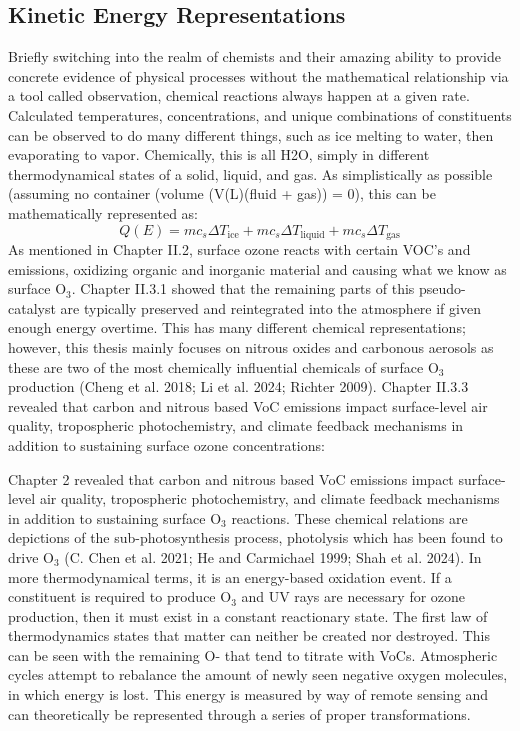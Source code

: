 \subsection{Kinetic Energy Representations} \label{methods:ke} Briefly switching into the realm of chemists and their amazing ability to provide concrete evidence of physical processes without the mathematical relationship via a tool called observation, chemical reactions always happen at a given rate. Calculated temperatures, concentrations, and unique combinations of constituents can be observed to do many different things, such as ice melting to water, then evaporating to vapor. Chemically, this is all H2O, simply in different thermodynamical states of a solid, liquid, and gas. As simplistically as possible (assuming no container (volume (V(L)(fluid + gas)) = 0), this can be mathematically represented as:
\[
Q(E) = mc_s \Delta T_{\text{ice}} + mc_s \Delta T_{\text{liquid}} + mc_s \Delta T_{\text{gas}}
\]
As mentioned in Chapter II.2, surface ozone reacts with certain VOC’s and emissions, oxidizing organic and inorganic material and causing what we know as surface O$_3$. Chapter II.3.1 showed that the remaining parts of this pseudo-catalyst are typically preserved and reintegrated into the atmosphere if given enough energy overtime. This has many different chemical representations; however, this thesis mainly focuses on nitrous oxides and carbonous aerosols as these are two of the most chemically influential chemicals of surface O$_3$ production (Cheng et al. 2018; Li et al. 2024; Richter 2009). Chapter II.3.3 revealed that carbon and nitrous based VoC emissions impact surface-level air quality, tropospheric photochemistry, and climate feedback mechanisms in addition to sustaining surface ozone concentrations:

Chapter 2 revealed that carbon and nitrous based VoC emissions impact surface-level air quality, tropospheric photochemistry, and climate feedback mechanisms in addition to sustaining surface O$_3$ reactions. These chemical relations are depictions of the sub-photosynthesis process, photolysis which has been found to drive O$_3$ (C. Chen et al. 2021; He and Carmichael 1999; Shah et al. 2024). In more thermodynamical terms, it is an energy-based oxidation event. If a constituent is required to produce O$_3$ and UV rays are necessary for ozone production, then it must exist in a constant reactionary state. The first law of thermodynamics states that matter can neither be created nor destroyed. This can be seen with the remaining O- that tend to titrate with VoCs. Atmospheric cycles attempt to rebalance the amount of newly seen negative oxygen molecules, in which energy is lost. This energy is measured by way of remote sensing and can theoretically be represented through a series of proper transformations. 
